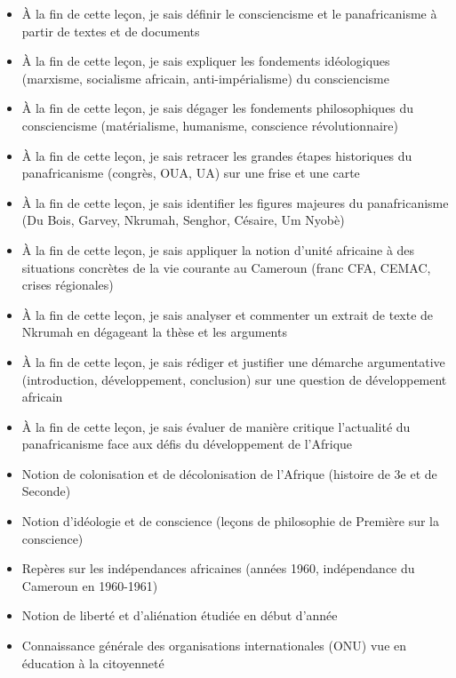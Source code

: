 \documentclass[11pt]{article}
\begin{document}
\begin{objectifs}
\begin{itemize}
\item À la fin de cette leçon, je sais définir le consciencisme et le panafricanisme à partir de textes et de documents
\item À la fin de cette leçon, je sais expliquer les fondements idéologiques (marxisme, socialisme africain, anti-impérialisme) du consciencisme
\item À la fin de cette leçon, je sais dégager les fondements philosophiques du consciencisme (matérialisme, humanisme, conscience révolutionnaire)
\item À la fin de cette leçon, je sais retracer les grandes étapes historiques du panafricanisme (congrès, OUA, UA) sur une frise et une carte
\item À la fin de cette leçon, je sais identifier les figures majeures du panafricanisme (Du Bois, Garvey, Nkrumah, Senghor, Césaire, Um Nyobè)
\item À la fin de cette leçon, je sais appliquer la notion d'unité africaine à des situations concrètes de la vie courante au Cameroun (franc CFA, CEMAC, crises régionales)
\item À la fin de cette leçon, je sais analyser et commenter un extrait de texte de Nkrumah en dégageant la thèse et les arguments
\item À la fin de cette leçon, je sais rédiger et justifier une démarche argumentative (introduction, développement, conclusion) sur une question de développement africain
\item À la fin de cette leçon, je sais évaluer de manière critique l'actualité du panafricanisme face aux défis du développement de l'Afrique
\end{itemize}
\end{objectifs}

\begin{prerequis}
\begin{itemize}
\item Notion de colonisation et de décolonisation de l'Afrique (histoire de 3e et de Seconde)
\item Notion d'idéologie et de conscience (leçons de philosophie de Première sur la conscience)
\item Repères sur les indépendances africaines (années 1960, indépendance du Cameroun en 1960-1961)
\item Notion de liberté et d'aliénation étudiée en début d'année
\item Connaissance générale des organisations internationales (ONU) vue en éducation à la citoyenneté
\end{itemize}
\end{prerequis}
\end{document}
